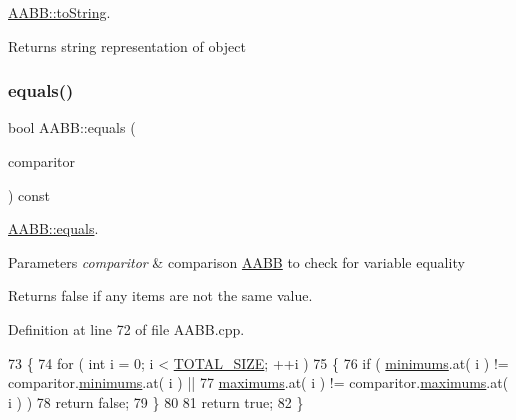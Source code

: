 \hyperlink{class_a_a_b_b_af66da47bd15d679936e05af231b45b75}{A\+A\+B\+B\+::to\+String}. 

\begin{DoxyReturn}{Returns}
string representation of object 
\end{DoxyReturn}
\mbox{\label{class_a_a_b_b_a11c212defb35c26aa0ffb3d3ae75d93a}} 
\subsubsection{\texorpdfstring{equals()}{equals()}}
{\footnotesize\ttfamily bool A\+A\+B\+B\+::equals (\begin{DoxyParamCaption}\item[{\hyperlink{class_a_a_b_b}{A\+A\+BB}}]{comparitor }\end{DoxyParamCaption}) const}



\hyperlink{class_a_a_b_b_a11c212defb35c26aa0ffb3d3ae75d93a}{A\+A\+B\+B\+::equals}. 


\begin{DoxyParams}{Parameters}
{\em comparitor} & comparison \hyperlink{class_a_a_b_b}{A\+A\+BB} to check for variable equality \\
\hline
\end{DoxyParams}
\begin{DoxyReturn}{Returns}
false if any items are not the same value. 
\end{DoxyReturn}


Definition at line 72 of file A\+A\+B\+B.\+cpp.


\begin{DoxyCode}
73 \{
74     \textcolor{keywordflow}{for} ( \textcolor{keywordtype}{int} i = 0; i < \hyperlink{class_a_a_b_b_a7ec2385af789441375335c09cff0709c}{TOTAL\_SIZE}; ++i )
75     \{
76         \textcolor{keywordflow}{if} ( \hyperlink{class_a_a_b_b_aaf1ec35e5c0258cd57e65429f93c14a2}{minimums}.at( i ) != comparitor.\hyperlink{class_a_a_b_b_aaf1ec35e5c0258cd57e65429f93c14a2}{minimums}.at( i ) ||
77                 \hyperlink{class_a_a_b_b_a1289c3a2e5c7a98f90d5bcdb8251a06f}{maximums}.at( i ) != comparitor.\hyperlink{class_a_a_b_b_a1289c3a2e5c7a98f90d5bcdb8251a06f}{maximums}.at( i ) )
78             \textcolor{keywordflow}{return} \textcolor{keyword}{false};
79     \}
80 
81     \textcolor{keywordflow}{return} \textcolor{keyword}{true};
82 \}
\end{DoxyCode}
\mbox{\label{class_a_a_b_b_aa2a1a47dc45291be16276dd397bc78fe}} 
